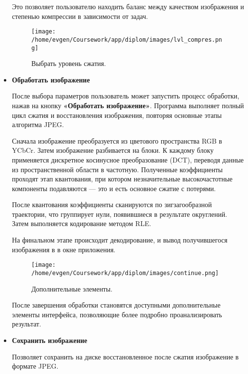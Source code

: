\begin{itemize}
    Это позволяет пользователю находить баланс между качеством изображения и степенью компрессии в зависимости от задач.
    \begin{figure}[h!]
        \centering
        \texttt{[image: /home/evgen/Coursework/app/diplom/images/lvl\_compres.png]}
        \caption{Выбрать уровень сжатия.}
        \label{fig:lvl_compres}
    \end{figure}

    \FloatBarrier

    \item \textbf{Обработать изображение}
    
    После выбора параметров пользователь может запустить процесс обработки, 
    нажав на кнопку \textbf{«Обработать изображение»}. 
    Программа выполняет полный цикл сжатия и восстановления изображения, повторяя основные этапы алгоритма JPEG.

    Сначала изображение преобразуется из цветового пространства RGB в YCbCr.
    Затем изображение разбивается на блоки.
    К каждому блоку применяется дискретное косинусное преобразование (DCT), 
    переводя данные из пространственной области в частотную. 
    Полученные коэффициенты проходят этап квантования, 
    при котором незначительные высокочастотные компоненты подавляются — это и есть основное сжатие с потерями.

    После квантования коэффициенты сканируются по зигзагообразной траектории, что группирует нули, 
    появившиеся в результате округлений. 
    Затем выполняется кодирование методом RLE.

    На финальном этапе происходит декодирование, и вывод получившегося изображения в в окне приложения.

    \begin{figure}[h!]
        \centering
        \texttt{[image: /home/evgen/Coursework/app/diplom/images/continue.png]}
        \caption{Дополнительные элементы.}
        \label{fig:continue}
    \end{figure}


    После завершения обработки становятся доступными дополнительные элементы интерфейса, 
    позволяющие более подробно проанализировать результат.

    \FloatBarrier

    \item \textbf{Сохранить изображение}
    
    Позволяет сохранить на диске восстановленное после сжатия изображение в формате JPEG.


\end{itemize}
